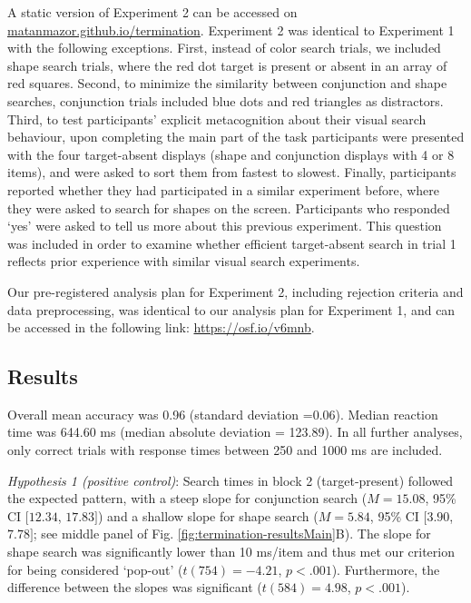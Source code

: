 \documentclass[12pt,twoside]{reedthesis}
\begin{document}
A static version of Experiment 2 can be accessed on \href{matanmazor.github.io/termination/experiments/demos/exp1/}{matanmazor.github.io/termination}. Experiment 2 was identical to Experiment 1 with the following exceptions. First, instead of color search trials, we included shape search trials, where the red dot target is present or absent in an array of red squares. Second, to minimize the similarity between conjunction and shape searches, conjunction trials included blue dots and red triangles as distractors. Third, to test participants' explicit metacognition about their visual search behaviour, upon completing the main part of the task participants were presented with the four target-absent displays (shape and conjunction displays with 4 or 8 items), and were asked to sort them from fastest to slowest. Finally, participants reported whether they had participated in a similar experiment before, where they were asked to search for shapes on the screen. Participants who responded `yes' were asked to tell us more about this previous experiment. This question was included in order to examine whether efficient target-absent search in trial 1 reflects prior experience with similar visual search experiments.

Our pre-registered analysis plan for Experiment 2, including rejection criteria and data preprocessing, was identical to our analysis plan for Experiment 1, and can be accessed in the following link: \url{https://osf.io/v6mnb}.

\hypertarget{results-1}{%
\subsection{Results}\label{results-1}}

Overall mean accuracy was 0.96 (standard deviation =0.06). Median reaction time was 644.60 ms (median absolute deviation = 123.89). In all further analyses, only correct trials with response times between 250 and 1000 ms are included.

\emph{Hypothesis 1 (positive control)}: Search times in block 2 (target-present) followed the expected pattern, with a steep slope for conjunction search (\(M = 15.08\), 95\% CI \([12.34\), \(17.83]\)) and a shallow slope for shape search (\(M = 5.84\), 95\% CI \([3.90\), \(7.78]\); see middle panel of Fig. \ref{fig:termination-resultsMain}B). The slope for shape search was significantly lower than 10 ms/item and thus met our criterion for being considered `pop-out' (\(t(754) = -4.21\), \(p < .001\)). Furthermore, the difference between the slopes was significant (\(t(584) = 4.98\), \(p < .001\)).
\end{document}
